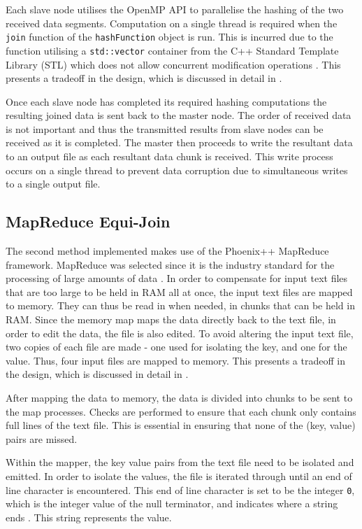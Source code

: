 \documentclass[10pt,twocolumn]{witseiepaper}
\begin{document}
Each slave node utilises the OpenMP API to parallelise the hashing of the two received data segments. Computation on a single thread is required when the \texttt{join} function of the \texttt{hashFunction} object is run. This is incurred due to the function utilising a \texttt{std::vector} container from the C++ Standard Template Library (STL) which does not allow concurrent modification operations \cite{stl-vector}. This presents a tradeoff in the design, which is discussed in detail in .

Once each slave node has completed its required hashing computations the resulting joined data is sent back to the master node. The order of received data is not important and thus the transmitted results from slave nodes can be received as it is completed. The master then proceeds to write the resultant data to an output file as each resultant data chunk is received. This write process occurs on a single thread to prevent data corruption due to simultaneous writes to a single output file.

\subsection{MapReduce Equi-Join}
The second method implemented makes use of the Phoenix++ MapReduce framework. MapReduce was selected since it is the industry standard for the processing of large amounts of data \cite{comparingMPIMapReduce}. In order to compensate for input text files that are too large to be held in RAM all at once, the input text files are mapped to memory. They can thus be read in when needed, in chunks that can be held in RAM. Since the memory map maps the data directly back to the text file, in order to edit the data, the file is also edited. To avoid altering the input text file, two copies of each file are made - one used for isolating the key, and one for the value. Thus, four input files are mapped to memory. This presents a tradeoff in the design, which is discussed in detail in .

After mapping the data to memory, the data is divided into chunks to be sent to the map processes. Checks are performed to ensure that each chunk only contains full lines of the text file. This is essential in ensuring that none of the (key, value) pairs are missed.

Within the mapper, the key value pairs from the text file need to be isolated and emitted. In order to isolate the values, the file is iterated through until an end of line character is encountered. This end of line character is set to be the integer \texttt{0}, which is the integer value of the null terminator, and indicates where a string ends \cite{phoenix}. This string represents the value.
\end{document}
